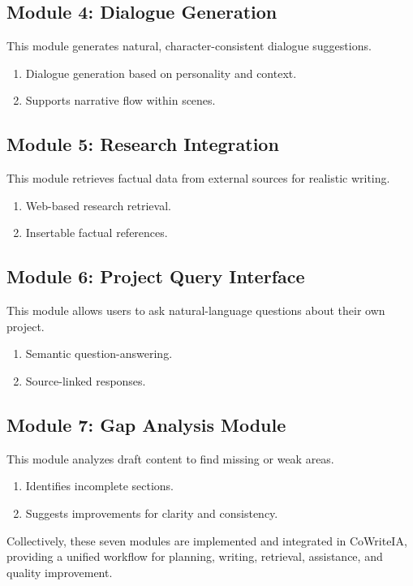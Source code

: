 \subsection{Module 4: Dialogue Generation}
This module generates natural, character-consistent dialogue suggestions.
\begin{enumerate}
    \item Dialogue generation based on personality and context.
    \item Supports narrative flow within scenes.
\end{enumerate}

\subsection{Module 5: Research Integration}
This module retrieves factual data from external sources for realistic writing.
\begin{enumerate}
    \item Web-based research retrieval.
    \item Insertable factual references.
\end{enumerate}

\subsection{Module 6: Project Query Interface}
This module allows users to ask natural-language questions about their own project.
\begin{enumerate}
    \item Semantic question-answering.
    \item Source-linked responses.
\end{enumerate}

\subsection{Module 7: Gap Analysis Module}
This module analyzes draft content to find missing or weak areas.
\begin{enumerate}
    \item Identifies incomplete sections.
    \item Suggests improvements for clarity and consistency.
\end{enumerate}

Collectively, these seven modules are implemented and integrated in CoWriteIA, providing a unified workflow for planning, writing, retrieval, assistance, and quality improvement.

